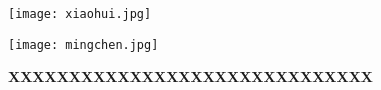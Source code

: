 \begin{flushleft}
\hspace{8.5mm}\texttt{[image: xiaohui.jpg]} %
\end{flushleft}
\begin{center} %
\texttt{[image: mingchen.jpg]} %
\end{center}
\vspace{6.5mm}
\begin{center}
{\heiti \bfseries {}}
\end{center}
\vspace{20mm}
\begin{center}
{\heiti \erhao \textbf{XXXXXXXXXXXXXXXXXXXXXXXXXXXXXX}}
\end{center}
\vspace{28mm}
\begin{center}
{\sanhao {}}\\\vspace{2.4mm}
{\sanhao {}}\\\vspace{2.4mm}
{\sanhao {}}\\\vspace{2.4mm}
{\sanhao {}}\\\vspace{2.4mm}
{\sanhao {}}\\\vspace{2.4mm}
{\sanhao {}}\\\vspace{2.4mm}
{\sanhao {}}
\end{center}
\vfill
\begin{center}
\makeatletter
\sanhao \heiti {\CJK@today}
\makeatother
\end{center}
